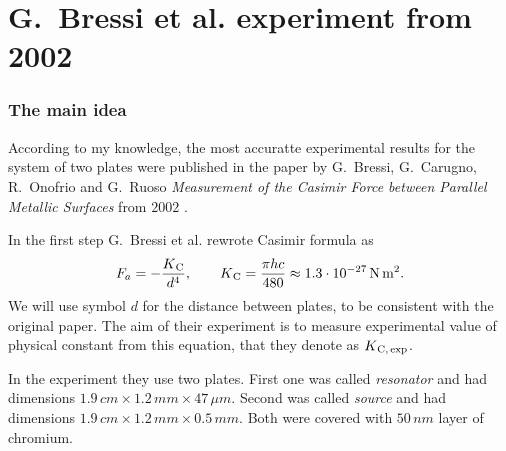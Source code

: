 \documentclass[10pt,t]{beamer}
\begin{document}
\section{G.~Bressi et al. experiment from 2002}



\begin{frame}
  \frametitle{The main idea}

  \vspace{-0.5em}


  According to my knowledge, the most accuratte experimental results for
  the system of two plates were published in the paper by G.~Bressi,
  G.~Carugno, R.~Onofrio and G.~Ruoso \textit{Measurement of the Casimir
    Force between Parallel Metallic Surfaces} from $2002$
  \parencite{Bressi-et-al-Measurement-of-the-Casimir-Force-ETC-Pub-2002}.

  In the first step G.~Bressi et al. rewrote Casimir formula as
  \begin{equation}
    \label{eq:G-Bressi-et-al-ETC-01}
    F_{ a } =
    -\frac{ K_{ \HorSpaceTwo \text{C} } }{ d^{ 4 } }, \qquad
    K_{ \HorSpaceTwo \text{C} } = \frac{ \pi h c }{ 480 } \approx
    1.3 \cdot 10^{ -27 } \, \si{N.m^{ 2 }}.
  \end{equation}
  We will use symbol $d$ for the distance between plates, to be consistent
  with the original paper. The aim of their experiment is to measure
  experimental value of physical constant from this equation, that they
  denote as $K_{ \hspace{0.07em} \text{C}, \, \text{exp} }$.

  In the experiment they use two plates. First one was called
  \textit{resonator} and had dimensions
  $1.9 \, \si{cm} \times 1.2 \, \si{mm} \times 47 \, \mu\si{m}$.
  Second was called \textit{source} and had dimensions
  $1.9 \, \si{cm} \times 1.2 \, \si{mm} \times 0.5 \, \si{mm}$. Both were covered
  with $50 \, \si{nm}$ layer of chromium.

\end{frame}
\end{document}
